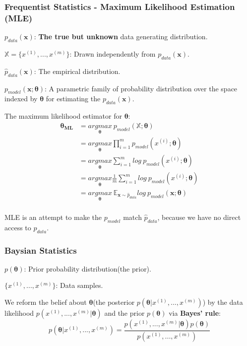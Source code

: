 \documentclass[12pt]{article}
\numberwithin{equation}{section}
\begin{document}
\subsubsection{Frequentist Statistics - Maximum Likelihood Estimation (MLE)}
$p_{data}(\boldsymbol{x})$: \textbf{The true but unknown} data generating distribution. \par
 $\mathbb{X}=\{x^{(1)},...,x^{(m)}\}$: Drawn independently from $p_{data}(\boldsymbol{x})$. \par
$\hat{p}_{data}(\boldsymbol{x})$: The empirical distribution. \par
$p_{model}(\boldsymbol{x;\theta})$: A parametric family of probability distribution over the space indexed by $\boldsymbol{\theta}$ for estimating the $p_{data}(\boldsymbol{x})$. \par
The maximum likelihood estimator for $\boldsymbol{\theta}$:
\begin{equation}\begin{split}
	\boldsymbol{\theta_{ML}}&=\underset{\boldsymbol{\theta}}{argmax}\ p_{model}({\mathbb{X};		\boldsymbol{\theta}}) \\
	&=\underset{\boldsymbol{\theta}}{argmax}\prod_{i=1}^{m}p_{model}(x^{(i)};\boldsymbol{\theta}) \\
	&=\underset{\boldsymbol{\theta}}{argmax}\sum_{i=1}^{m}log\ p_{model}(x^{(i)};\boldsymbol{\theta}) \\
	&=\underset{\boldsymbol{\theta}}{argmax}\frac{1}{m}\sum_{i=1}^{m}log\ p_{model}(x^{(i)};\boldsymbol{\theta}) \\
	&=\underset{\boldsymbol{\theta}}{argmax}\ \mathbb{E}_{\boldsymbol{x}\sim\hat{p}_{data}}log\ p_{model}(\boldsymbol{x};\boldsymbol{\theta}) \\
\end{split}\end{equation} \par
MLE is an attempt to make the $p_{model}$ match $\hat{p}_{data}$, because we have no direct access to $p_{data}$.
\subsubsection{Baysian Statistics}
$p(\boldsymbol\theta)$: Prior probability distribution(the prior). \par
$\{x^{(1)},...,x^{(m)}\}$: Data samples. \par
We reform the belief about $\boldsymbol\theta$(the posterior $p(\boldsymbol\theta|x^{(1)},...,x^{(m)})$) by the data likelihood $p(x^{(1)},...,x^{(m)}|\boldsymbol\theta)$ and the prior $p(\boldsymbol\theta)$ via \textbf{Bayes' rule}: 
\begin{equation}
	p(\boldsymbol\theta|x^{(1)},...,x^{(m)})=\frac{p(x^{(1)},...,x^{(m)}|\boldsymbol\theta)p(\boldsymbol\theta)}{p(x^{(1)},...,x^{(m)})}
\end{equation}
\end{document}
